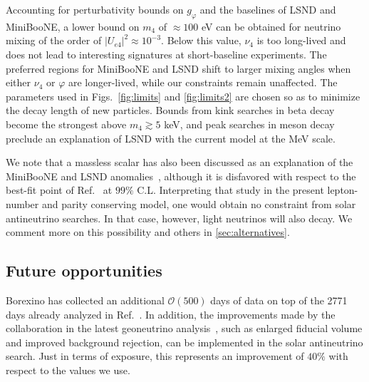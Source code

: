 \documentclass[
reprint,
superscriptaddress,
showpacs,
preprintnumbers,
nofootinbib,
nobibnotes,
amsmath,
amssymb, 
aps,
prd,
floatfix
]{revtex4-1}
\renewcommand{\phi}{\varphi}
\begin{document}
Accounting for perturbativity bounds on $g_\phi$ and the baselines of LSND and MiniBooNE, a lower bound on $m_4$ of $\approx 100$ eV can be obtained for neutrino mixing of the order of $|U_{e4}|^2\approx10^{-3}$. Below this value, $\nu_4$ is too long-lived and does not lead to interesting signatures at short-baseline experiments. The preferred regions for MiniBooNE and LSND shift to larger mixing angles when either $\nu_4$ or $\phi$ are longer-lived, while our constraints remain unaffected. The parameters used in Figs.~\ref{fig:limits} and \ref{fig:limits2} are chosen so as to minimize the decay length of new particles. Bounds from kink searches in beta decay become the strongest above $m_4 \gtrsim 5$ keV, and peak searches in meson decay preclude an explanation of LSND with the current model at the MeV scale.


We note that a massless scalar has also been discussed as an explanation of the MiniBooNE and LSND anomalies~\cite{deGouvea:2019qre}, although it is disfavored with respect to the best-fit point of Ref.~\cite{Dentler:2019dhz} at $99\%$ C.L. Interpreting that study in the present lepton-number and parity conserving model, one would obtain no constraint from solar antineutrino searches. In that case, however, light neutrinos will also decay. We comment more on this possibility and others in \ref{sec:alternatives}.


\subsection{Future opportunities}

Borexino has collected an additional $\mathcal{O}(500)$ days of data on top of the 2771 days already analyzed in Ref.~\cite{Agostini:2019yuq}. In addition, the improvements made by the collaboration in the latest geoneutrino analysis~\cite{Agostini:2019dbs}, such as enlarged fiducial volume and improved background rejection, can be implemented in the solar antineutrino search. Just in terms of exposure, this represents an improvement of $40\%$ with respect to the values we use. 

\end{document}
